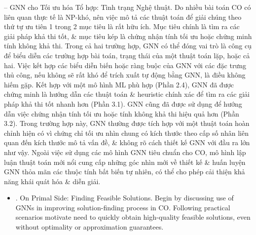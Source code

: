 \documentclass{article}
\begin{document}
\begin{itemize}
    -- {\sf GNN cho Tối ưu hóa Tổ hợp: Tình trạng Nghệ thuật.} Do nhiều bài toán CO có liên quan thực tế là NP-khó, nên việc mô tả các thuật toán để giải chúng theo thứ tự ưu tiên 1 trong 2 mục tiêu là rất hữu ích. Mục tiêu chính là tìm ra các giải pháp khả thi tốt, \& mục tiêu kép là chứng nhận tính tối ưu hoặc chứng minh tính không khả thi. Trong cả hai trường hợp, GNN có thể đóng vai trò là công cụ để biểu diễn các trường hợp bài toán, trạng thái của một thuật toán lặp, hoặc cả hai. Việc kết hợp các biểu diễn biến hoặc ràng buộc của GNN với các đặc trưng thủ công, nếu không sẽ rất khó để trích xuất tự động bằng GNN, là điều không hiếm gặp. Kết hợp với một mô hình ML phù hợp (Phần 2.4), GNN đã được chứng minh là hướng dẫn các thuật toán \& heuristic chính xác để tìm ra các giải pháp khả thi tốt nhanh hơn (Phần 3.1). GNN cũng đã được sử dụng để hướng dẫn việc chứng nhận tính tối ưu hoặc tính không khả thi hiệu quả hơn (Phần 3.2). Trong trường hợp này, GNN thường được tích hợp với một thuật toán hoàn chỉnh hiện có vì chứng chỉ tối ưu nhìn chung có kích thước theo cấp số nhân liên quan đến kích thước mô tả vấn đề, \& không rõ cách thiết kế GNN với đầu ra lớn như vậy. Ngoài việc sử dụng các mô hình GNN tiêu chuẩn cho CO, mô hình lập luận thuật toán mới nổi cung cấp những góc nhìn mới về thiết kế \& huấn luyện GNN thỏa mãn các thuộc tính bất biến tự nhiên, có thể cho phép cải thiện khả năng khái quát hóa \& diễn giải.
    \begin{itemize}
        \item {. On Primal Side: Finding Feasible Solutions.} Begin by discussing use of GNNs in improving solution-finding process in CO. Following practical scenarios motivate need to quickly obtain high-quality feasible solutions, even without optimality or approximation guarantees.


\end{itemize}
\end{itemize}
\end{document}

